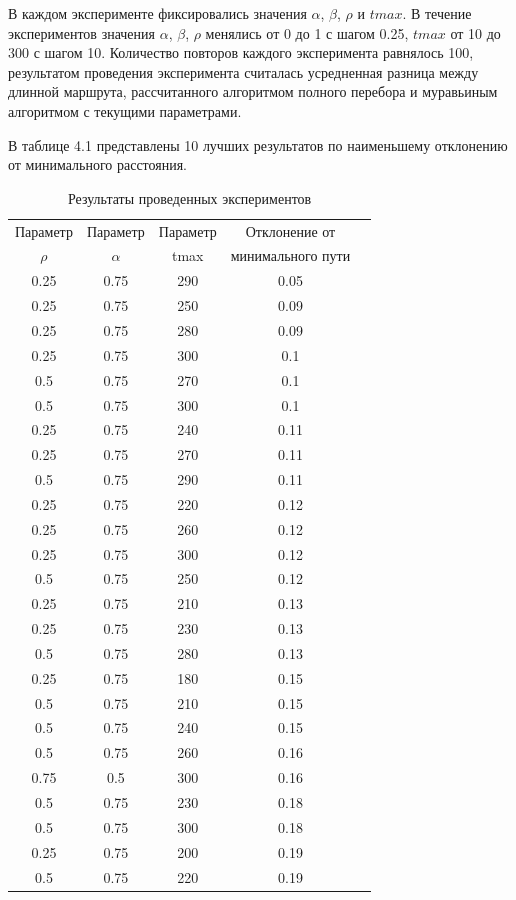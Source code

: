 \documentclass[a4paper,12pt]{report}
\begin{document}
В каждом эксперименте фиксировались значения $\alpha$, $\beta$, $\rho$ и $tmax$. В течение экспериментов значения $\alpha$, $\beta$, $\rho$ менялись от 0 до 1 с шагом 0.25, $tmax$ от 10 до 300 с шагом 10. Количество повторов каждого эксперимента равнялось 100, результатом проведения эксперимента считалась усредненная разница между длинной маршрута, рассчитанного алгоритмом полного перебора и муравьиным алгоритмом с текущими параметрами. 

В таблице 4.1 представлены 10 лучших результатов по наименьшему отклонению от минимального расстояния.

\begin{table}[ht!]
\begin{center}
\caption{Результаты проведенных экспериментов}
\begin{tabular}{| c | c | c | c | c |}
\hline
Параметр & Параметр & Параметр & Отклонение от  \\
$\rho$ & $\alpha$ & tmax & минимального пути \\
\hline
0.25 & 0.75 & 290 & 0.05\\
\hline
0.25 & 0.75 & 250 & 0.09\\
\hline
0.25 & 0.75 & 280 & 0.09\\
\hline 
0.25 & 0.75 & 300 &0.1\\
\hline
0.5 & 0.75 & 270 & 0.1\\
\hline
0.5 & 0.75 & 300 & 0.1\\
\hline
0.25 & 0.75 & 240 & 0.11\\
\hline
0.25 & 0.75 & 270 & 0.11\\
\hline
0.5 & 0.75 & 290 & 0.11\\
\hline
0.25 & 0.75 & 220 & 0.12\\
\hline
0.25 & 0.75 & 260 & 0.12\\
\hline
0.25 & 0.75 & 300 & 0.12\\
\hline
0.5 & 0.75 & 250 & 0.12\\
\hline
0.25 & 0.75 & 210 & 0.13\\
\hline
0.25 & 0.75 & 230 & 0.13\\
\hline
0.5 & 0.75 & 280 & 0.13\\
\hline
0.25 & 0.75 & 180 & 0.15\\
\hline
0.5 & 0.75 & 210 & 0.15\\
\hline
0.5 & 0.75 & 240 & 0.15\\
\hline
0.5 & 0.75 & 260 & 0.16\\
\hline
0.75 & 0.5 & 300 & 0.16\\
\hline
0.5 & 0.75 & 230 & 0.18\\
\hline
0.5 & 0.75 & 300 & 0.18\\
\hline
0.25 & 0.75 & 200 & 0.19\\
\hline
0.5 & 0.75 & 220 & 0.19\\
\hline
\end{tabular}
\end{center}
\end{table}
\end{document}
